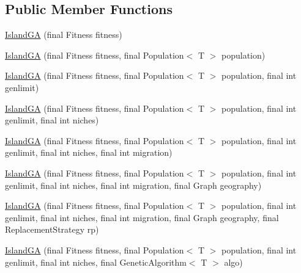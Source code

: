\subsection*{Public Member Functions}
\begin{DoxyCompactItemize}
\item 
\hyperlink{classjenes_1_1algorithms_1_1_island_g_a_3_01_t_01extends_01_chromosome_01_4_ae36c7bc43e9b6f50a74cd3c2be85d17b}{Island\-G\-A} (final Fitness fitness)
\item 
\hyperlink{classjenes_1_1algorithms_1_1_island_g_a_3_01_t_01extends_01_chromosome_01_4_a7e50ffddeef3cd18e479696e1d7258e4}{Island\-G\-A} (final Fitness fitness, final Population$<$ T $>$ population)
\item 
\hyperlink{classjenes_1_1algorithms_1_1_island_g_a_3_01_t_01extends_01_chromosome_01_4_abaca651c904eb2d4a89380444c3dfd52}{Island\-G\-A} (final Fitness fitness, final Population$<$ T $>$ population, final int genlimit)
\item 
\hyperlink{classjenes_1_1algorithms_1_1_island_g_a_3_01_t_01extends_01_chromosome_01_4_a462cff7f1ffe7db7a13ab925a8f85c50}{Island\-G\-A} (final Fitness fitness, final Population$<$ T $>$ population, final int genlimit, final int niches)
\item 
\hyperlink{classjenes_1_1algorithms_1_1_island_g_a_3_01_t_01extends_01_chromosome_01_4_a183f962ceb12d8cd2885b0ef4a6dd988}{Island\-G\-A} (final Fitness fitness, final Population$<$ T $>$ population, final int genlimit, final int niches, final int migration)
\item 
\hyperlink{classjenes_1_1algorithms_1_1_island_g_a_3_01_t_01extends_01_chromosome_01_4_a36fa940b12f68377764049c7898fd8bd}{Island\-G\-A} (final Fitness fitness, final Population$<$ T $>$ population, final int genlimit, final int niches, final int migration, final Graph geography)
\item 
\hyperlink{classjenes_1_1algorithms_1_1_island_g_a_3_01_t_01extends_01_chromosome_01_4_a1b122013a5bad475ec45c67737029e68}{Island\-G\-A} (final Fitness fitness, final Population$<$ T $>$ population, final int genlimit, final int niches, final int migration, final Graph geography, final Replacement\-Strategy rp)
\item 
\hyperlink{classjenes_1_1algorithms_1_1_island_g_a_3_01_t_01extends_01_chromosome_01_4_a1347ad1ffe4f878c6f92d4a12484f174}{Island\-G\-A} (final Fitness fitness, final Population$<$ T $>$ population, final int genlimit, final int niches, final Genetic\-Algorithm$<$ T $>$ algo)
\item 

\end{DoxyCompactItemize}
